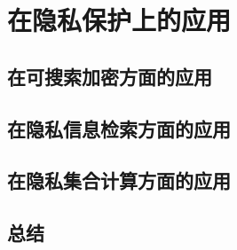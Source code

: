 
\chapter{在隐私保护上的应用}\label{chp:application}

\section{在可搜索加密方面的应用}

\section{在隐私信息检索方面的应用}

\section{在隐私集合计算方面的应用}

\section{总结}
